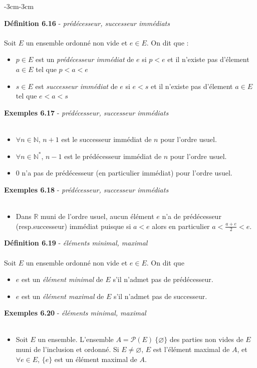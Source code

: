 \documentclass{article}
\newcommand{\notion}[1]{\textcolor{vert_fonce}{\textit{#1}}}
\newenvironment{definition}[2]
{
    \begin{boite_definition}
    \textbf{\textcolor{rouge_fonce}{Définition #1}} - \textit{#2} \\ \\
}
{
    \end{boite_definition}
    \vspace{15pt}
}
\newenvironment{exemples}[2]
{
    \begin{boite_exemples}
    \textbf{\textcolor{bleu_fonce}{Exemples #1}} - \textit{#2} \\ \\
    \begin{itemize}[label=$\blacktriangleright$ ]                    
}
{   
    \end{itemize}
    \end{boite_exemples}
    \vspace{15pt}
}
\begin{document}
\begin{adjustwidth}{-3cm}{-3cm}

\begin{definition}{6.16}{prédécesseur, successeur immédiats}
Soit $E$ un ensemble ordonné non vide et $e \in E$. On dit que :
    \begin{itemize}
        \item $p \in E$ est un \notion{prédécesseur immédiat} de $e$ si $p<e$ et il n'existe pas d'élement $a\in E$ tel que $p<a<e$
        \item $s \in E$ est \notion{successeur  immédiat} de $e$ si $e<s$ et il n'existe pas d'élement $a\in E$ tel que $e<a<s$
    \end{itemize}
\end{definition}

\begin{exemples}{6.17}{prédécesseur, successeur immédiats}
    \item $\forall n \in \mathbb{N}$, $n+1$ est le successeur immédiat de $n$ pour l'ordre usuel.
    \item $\forall n \in \mathbb{N}^*$, $n-1$ est le prédécesseur immédiat de $n$ pour l'ordre usuel.
    \item $0$ n'a pas de prédécesseur (en particulier immédiat) pour l'ordre usuel.
\end{exemples}


\begin{exemples}{6.18}{prédécesseur, successeur immédiats}
    \item Dans $\mathbb{R}$ muni de l'ordre usuel, aucun élément $e$ n'a de prédécesseur (resp.successeur) immédiat puisque si $a<e$ alors en particulier $a<\frac{a+e}{2}<e$.
\end{exemples}


\begin{definition}{6.19}{éléments minimal, maximal}
    Soit $E$ un ensemble ordonné non vide et $e \in E$. On dit que \begin{itemize}
        \item $e$ est un \notion{élément minimal} de $E$ s'il n'admet pas de prédécesseur.
        \item $e$ est un \notion{élément maximal} de $E$ s'il n'admet pas de successeur.
    \end{itemize}

\end{definition}

\begin{exemples}{6.20}{éléments minimal, maximal}
    \item Soit $E$ un ensemble. L'ensemble $A = \mathcal{P}(E) \ \{\varnothing\}$ des parties non vides de $E$ muni de l'inclusion et ordonné. Si $E \neq \varnothing$, $E$ est l'élément maximal de $A$, et $\forall e \in E$, $\{e\}$ est un élément maximal de $A$.
\end{exemples}


\end{adjustwidth}
\end{document}
